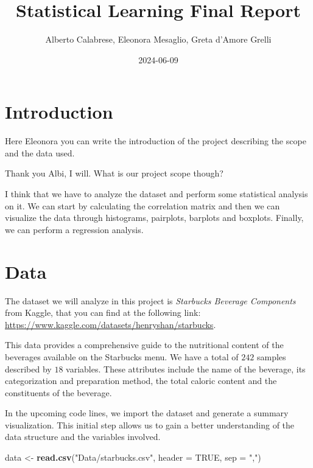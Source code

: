 \documentclass[
]{article}
\title{Statistical Learning Final Report}
\author{Alberto Calabrese, Eleonora Mesaglio, Greta d'Amore Grelli}
\date{2024-06-09}
\newenvironment{Shaded}{\begin{snugshade}}{\end{snugshade}}
\newcommand{\AttributeTok}[1]{\textcolor[rgb]{0.13,0.29,0.53}{#1}}
\newcommand{\ConstantTok}[1]{\textcolor[rgb]{0.56,0.35,0.01}{#1}}
\newcommand{\FunctionTok}[1]{\textcolor[rgb]{0.13,0.29,0.53}{\textbf{#1}}}
\newcommand{\NormalTok}[1]{#1}
\newcommand{\OtherTok}[1]{\textcolor[rgb]{0.56,0.35,0.01}{#1}}
\newcommand{\StringTok}[1]{\textcolor[rgb]{0.31,0.60,0.02}{#1}}
\begin{document}
\maketitle

{
\setcounter{tocdepth}{3}
\tableofcontents
}
\section{Introduction}\label{introduction}

Here Eleonora you can write the introduction of the project describing
the scope and the data used.

Thank you Albi, I will. What is our project scope though?

I think that we have to analyze the dataset and perform some statistical
analysis on it. We can start by calculating the correlation matrix and
then we can visualize the data through histograms, pairplots, barplots
and boxplots. Finally, we can perform a regression analysis.

\section{Data}\label{data}

The dataset we will analyze in this project is \emph{Starbucks Beverage
Components} from Kaggle, that you can find at the following link:
\url{https://www.kaggle.com/datasets/henryshan/starbucks}.

This data provides a comprehensive guide to the nutritional content of
the beverages available on the Starbucks menu. We have a total of
\(242\) samples described by \(18\) variables. These attributes include
the name of the beverage, its categorization and preparation method, the
total caloric content and the constituents of the beverage.

In the upcoming code lines, we import the dataset and generate a summary
visualization. This initial step allows us to gain a better
understanding of the data structure and the variables involved.

\begin{Shaded}
\begin{Highlighting}[]
\NormalTok{data }\OtherTok{\textless{}{-}} \FunctionTok{read.csv}\NormalTok{(}\StringTok{"Data/starbucks.csv"}\NormalTok{, }\AttributeTok{header =} \ConstantTok{TRUE}\NormalTok{, }\AttributeTok{sep =} \StringTok{","}\NormalTok{)}
\end{Highlighting}
\end{Shaded}
\end{document}
